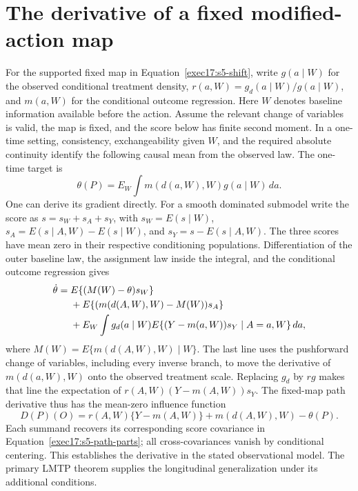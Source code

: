\section{The derivative of a fixed modified-action map}
\label{exec17:s5-derivative}

For the supported fixed map in Equation~\eqref{exec17:s5-shift}, write
$g(a\mid W)$ for the observed conditional treatment density,
$r(a,W)=g_d(a\mid W)/g(a\mid W)$, and $m(a,W)$ for the conditional outcome
regression. Here $W$ denotes baseline information available before the action.
Assume the relevant change of variables is valid, the map is fixed, and the
score below has finite second moment. In a one-time setting, consistency,
exchangeability given $W$, and the required absolute continuity identify the
following causal mean from the observed law. The one-time target is
\begin{equation}
 \theta(P)=E_W\int m(d(a,W),W)g(a\mid W)\,da.
 \label{exec17:s5-lmtp-target}
\end{equation}
One can derive its gradient directly. For a smooth dominated submodel write
the score as $s=s_W+s_A+s_Y$, with
$s_W=E(s\mid W)$,
$s_A=E(s\mid A,W)-E(s\mid W)$, and
$s_Y=s-E(s\mid A,W)$. The three scores have mean zero in their respective
conditioning populations. Differentiation of the outer baseline law, the
assignment law inside the integral, and the conditional outcome regression
gives
\begin{align}
 \dot\theta={}&E\{(M(W)-\theta)s_W\}\notag\\
 &+E\{(m(d(A,W),W)-M(W))s_A\}\notag\\
 &+E_W\int g_d(a\mid W)
       E\{(Y-m(a,W))s_Y\mid A=a,W\}\,da ,
 \label{exec17:s5-path-parts}
\end{align}
where $M(W)=E\{m(d(A,W),W)\mid W\}$. The last line uses the pushforward
change of variables, including every inverse branch, to move the derivative
of $m(d(a,W),W)$ onto the observed treatment scale. Replacing $g_d$ by $rg$
makes that line the expectation of $r(A,W)(Y-m(A,W))s_Y$.
The fixed-map path derivative thus has the mean-zero influence function
\begin{equation}
 D(P)(O)=r(A,W)\{Y-m(A,W)\}+m(d(A,W),W)-\theta(P).
 \label{exec17:s5-lmtp-if}
\end{equation}
Each summand recovers its corresponding score covariance in
Equation~\eqref{exec17:s5-path-parts}; all cross-covariances vanish by
conditional centering. This establishes the derivative in the stated
observational model. The primary LMTP theorem supplies the longitudinal
generalization under its additional conditions.~\citep{lmtp2023}

